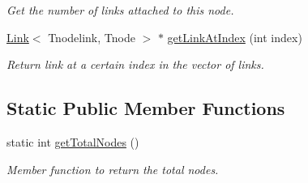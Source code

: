 \begin{DoxyCompactItemize}
\begin{DoxyCompactList}\small\item\em Get the number of links attached to this node. \end{DoxyCompactList}\item 
\hyperlink{classLink}{Link}$<$ Tnodelink, Tnode $>$ $\ast$ \hyperlink{classNode_a9a4566b6e6ec863dd4e635b76faba5d2}{get\+Link\+At\+Index} (int index)\hypertarget{classNode_a9a4566b6e6ec863dd4e635b76faba5d2}{}\label{classNode_a9a4566b6e6ec863dd4e635b76faba5d2}

\begin{DoxyCompactList}\small\item\em Return link at a certain index in the vector of links. \end{DoxyCompactList}\end{DoxyCompactItemize}
\subsection*{Static Public Member Functions}
\begin{DoxyCompactItemize}
\item 
static int \hyperlink{classNode_abde8cc3db1ffa61da6d907c4d9ffa1e3}{get\+Total\+Nodes} ()
\begin{DoxyCompactList}\small\item\em Member function to return the total nodes. \end{DoxyCompactList}\end{DoxyCompactItemize}

